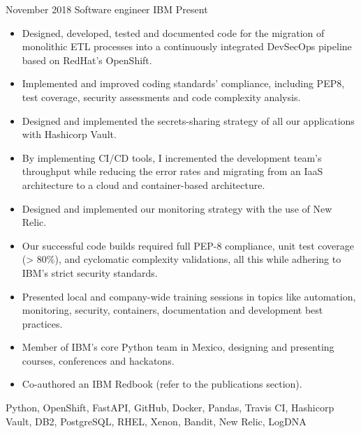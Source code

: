 %
%
%


\begin{experiences}
    \experience
        {November 2018}
        {Software engineer}
        {IBM}
        {Present}
        {
            \begin{itemize}
                \item Designed, developed, tested and documented code for the 
                migration of monolithic ETL processes into a continuously 
                integrated DevSecOps pipeline based on RedHat's OpenShift.
                \item Implemented and improved coding standards' compliance, 
                including PEP8, test coverage, security assessments and code 
                complexity analysis.
                \item Designed and implemented the secrets-sharing strategy of
                all our applications with Hashicorp Vault.
                \item By implementing CI/CD tools, I incremented the development 
                team's throughput while reducing the error rates and migrating 
                from an IaaS architecture to a cloud and container-based 
                architecture.
                \item Designed and implemented our monitoring strategy with the
                use of New Relic.
				\item Our successful code builds required full PEP-8 
                compliance, unit test coverage (> 80\%), and cyclomatic complexity 
                validations, all this while adhering to IBM's strict security 
                standards.
				\item Presented local and company-wide training sessions in 
                topics like automation, monitoring, security, containers, documentation 
                and development best practices.
                \item Member of IBM's core Python team in Mexico, designing and presenting
                courses, conferences and hackatons.
                \item Co-authored an IBM Redbook (refer to the publications section).
            \end{itemize}
        }
        {
            Python,
            OpenShift,
            FastAPI,
            GitHub,
            Docker,
            Pandas,
            Travis CI,
            Hashicorp Vault,
            DB2,
            PostgreSQL,
            RHEL,
            Xenon,
            Bandit,
            New Relic,
            LogDNA
        }


\end{experiences}
